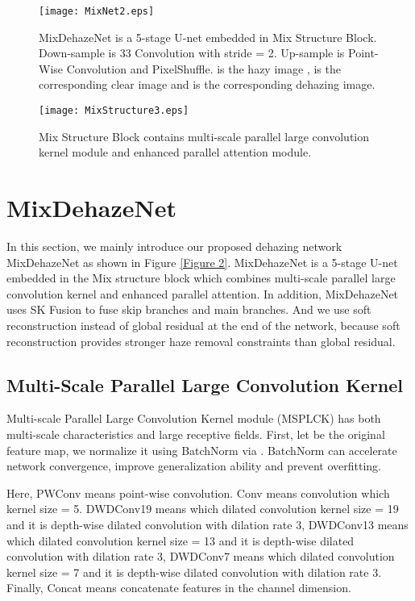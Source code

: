 \documentclass[10pt,twocolumn,letterpaper]{article}
\begin{document}
\begin{figure*}
    \centering
    \texttt{[image: MixNet2.eps]}
     \caption{MixDehazeNet is a 5-stage U-net embedded in Mix Structure Block. Down-sample is 33 Convolution with stride = 2. Up-sample is Point-Wise Convolution and PixelShuffle. {} is the hazy image , {} is the corresponding clear image and  is the corresponding dehazing image.}
    \label{Figure 2}
    \centering
    \texttt{[image: MixStructure3.eps]}
     \caption{Mix Structure Block contains multi-scale parallel large convolution kernel module and enhanced parallel attention module.}
     \label{Figure 3}
\end{figure*}

\section{MixDehazeNet}
In this section, we mainly introduce our proposed dehazing network MixDehazeNet as shown in Figure \ref{Figure 2}. MixDehazeNet is a 5-stage U-net embedded in the Mix structure block which combines multi-scale parallel large convolution kernel and enhanced parallel attention. In addition, MixDehazeNet uses SK Fusion \cite{song2022vision} to fuse skip branches and main branches. And we use soft reconstruction \cite{song2022vision} instead of global residual at the end of the network, because soft reconstruction provides stronger haze removal constraints than global residual. 

\subsection{Multi-Scale Parallel Large Convolution Kernel}
Multi-scale Parallel Large Convolution Kernel module (MSPLCK) has both multi-scale characteristics and large receptive fields. First, let  be the original feature map, we normalize it using BatchNorm via . BatchNorm can accelerate network convergence, improve generalization ability and prevent overfitting.  

Here, PWConv means point-wise convolution. Conv means convolution which kernel size = 5. DWDConv19 means which dilated convolution kernel size = 19 and it is  depth-wise dilated convolution with dilation rate 3, DWDConv13 means which dilated convolution kernel size = 13 and it is  depth-wise dilated convolution with dilation rate 3, DWDConv7 means which dilated convolution kernel size = 7 and it is  depth-wise dilated convolution with dilation rate 3. Finally, Concat means concatenate features in the channel dimension.
\end{document}
